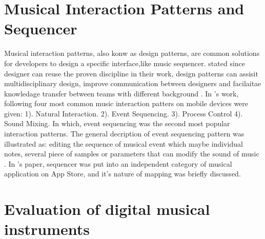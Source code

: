 \section{Musical Interaction Patterns and Sequencer}
Musical interaction patterns, also konw as design patterns, are common solutions for developers to design a specific interface,like music sequencer. \citeauthor{Reference4} stated since designer can reuse the proven discipline in their work, design patterns can assisit multidisciplinary design, improve communication between designers and facilaitae knowledage transfer between teams with different background \citep{Reference4}. In \citeauthor{Reference4}'s work, following four most common music interaction patters on mobile devices were given:
1). Natural Interaction. 2). Event Sequencing. 3). Process Control 4). Sound Mixing.
In which, event sequencing was the second most popular interaction patterns. The general decription of event sequencing pattern was illustrated as: editing the sequence of musical event which maybe individual notes, several piece of samples or parameters that can modify the sound of music \citep{Reference4}. In \citeauthor{Reference13}'s paper, sequencer was put into an independent category of musical application on App Store, and it's nature of mapping was briefly discussed.


\section{Evaluation of digital musical instruments}

